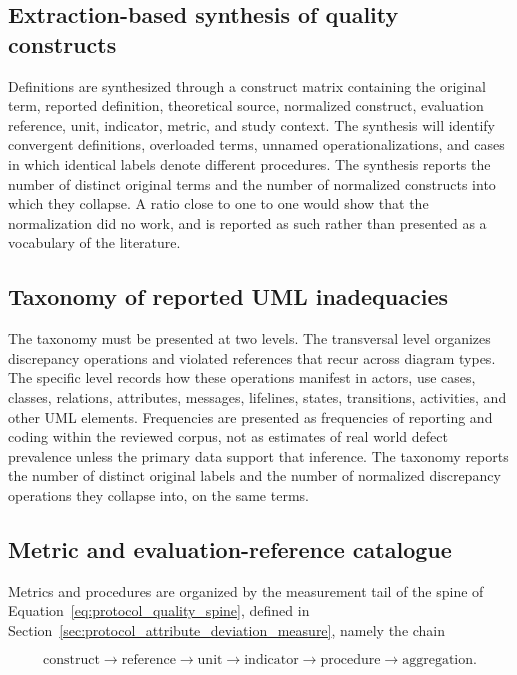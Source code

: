 \subsection{Extraction-based synthesis of quality constructs}

Definitions are synthesized through a construct matrix containing the original term, reported definition, theoretical source, normalized construct, evaluation reference, unit, indicator, metric, and study context. The synthesis will identify convergent definitions, overloaded terms, unnamed operationalizations, and cases in which identical labels denote different procedures. The synthesis reports the number of distinct original terms and the number of normalized constructs into which they collapse. A ratio close to one to one would show that the normalization did no work, and is reported as such rather than presented as a vocabulary of the literature.

\subsection{Taxonomy of reported UML inadequacies}

The taxonomy must be presented at two levels. The transversal level organizes discrepancy operations and violated references that recur across diagram types. The specific level records how these operations manifest in actors, use cases, classes, relations, attributes, messages, lifelines, states, transitions, activities, and other UML elements. Frequencies are presented as frequencies of reporting and coding within the reviewed corpus, not as estimates of real world defect prevalence unless the primary data support that inference. The taxonomy reports the number of distinct original labels and the number of normalized discrepancy operations they collapse into, on the same terms.

\subsection{Metric and evaluation-reference catalogue}

Metrics and procedures are organized by the measurement tail of the spine of Equation~\ref{eq:protocol_quality_spine}, defined in Section~\ref{sec:protocol_attribute_deviation_measure}, namely the chain

\begin{equation}
\text{construct} \rightarrow \text{reference} \rightarrow \text{unit} \rightarrow \text{indicator} \rightarrow \text{procedure} \rightarrow \text{aggregation}.
\label{eq:protocol_metrology_chain}
\end{equation}

